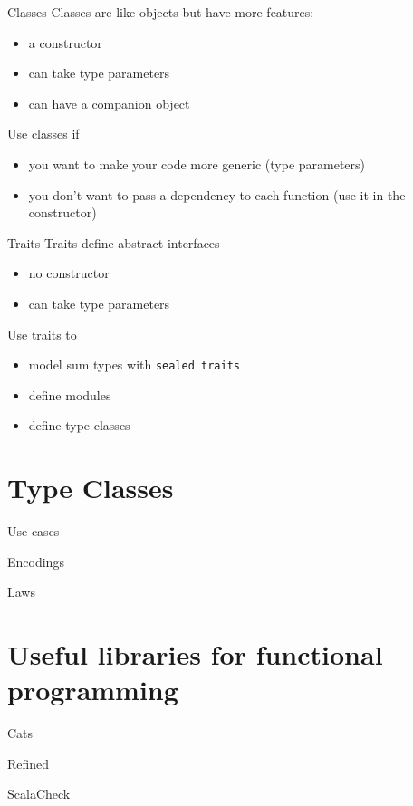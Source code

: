 \documentclass[10pt]{beamer}
\begin{document}
  \begin{frame}{Classes}
    Classes are like objects but have more features:
    \begin{itemize}
      \item a constructor
      \item can take type parameters
      \item can have a companion object
    \end{itemize}
    Use classes if
    \begin{itemize}
      \item you want to make your code more generic (type parameters)
      \item you don't want to pass a dependency to each function (use it in the constructor)
    \end{itemize}
  \end{frame}

  \begin{frame}{Traits}
    Traits define abstract interfaces
    \begin{itemize}
      \item no constructor
      \item can take type parameters
    \end{itemize}
    Use traits to
    \begin{itemize}
      \item model sum types with \texttt{sealed traits}
      \item define modules
      \item define type classes
    \end{itemize}
  \end{frame}

  \section{Type Classes}
  \begin{frame}{Use cases}
  \end{frame}

  \begin{frame}{Encodings}
  \end{frame}

  \begin{frame}{Laws}
  \end{frame}

  \section{Useful libraries for functional programming}
  \begin{frame}{Cats}
  \end{frame}

  \begin{frame}{Refined}
  \end{frame}

  \begin{frame}{ScalaCheck}
  \end{frame}
\end{document}
